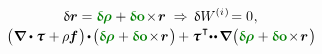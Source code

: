 \nopagebreak\vspace{-0.25em}\begin{equation*}
\begin{array}{c}
\variation{\currentlocationvector} = \constvarvector{\hspace{-0.1ex}\bm{\rho}} \hspace{.1ex} + \constvarvector{o} \hspace{-0.33ex} \times \hspace{-0.33ex} \currentlocationvector
\hspace{.66ex}\Rightarrow\hspace{.4ex}
\variation{\internalwork} \hspace{-0.2ex} = 0
\hspace{.1ex} ,
\\[.2em]
%
\bigl( \hspace{.1ex} \boldnabla \dotp \cauchystress \hspace{.1ex} + \hspace{-0.1ex} \massdensity \hspace{-0.1ex} \massloadvector \hspace{.16ex} \bigr)
\hspace{-0.25ex} \dotp \hspace{-0.25ex}
\bigl(  \constvarvector{\hspace{-0.1ex}\bm{\rho}} \hspace{.1ex} + \constvarvector{o} \hspace{-0.33ex} \times \hspace{-0.33ex} \currentlocationvector \hspace{.2ex} \bigr) \hspace{-0.16ex}
+ \cauchystress^{\hspace{.16ex}\T} \hspace{-0.5ex}
\dotdotp
\hspace{-0.16ex} \boldnabla \hspace{.1ex} \bigl(
\constvarvector{\hspace{-0.1ex}\bm{\rho}} \hspace{.1ex} +
\constvarvector{o} \hspace{-0.33ex} \times \hspace{-0.33ex} \currentlocationvector \hspace{.2ex} \bigr) \hspace{-0.25ex}

\end{array}
\end{equation*}
